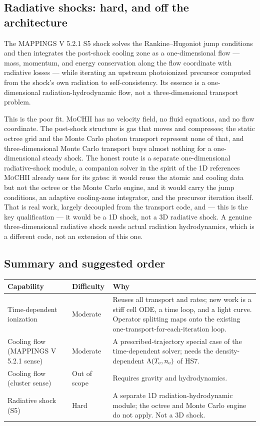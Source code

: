 \documentclass[english,a4paper]{my_memo}
\newcommand{\MoCHII}{\textsc{MoCHII}}
\newcommand{\Mappings}{MAPPINGS V 5.2.1}
\newcommand{\Te}{T_{\rm e}}
\newcommand{\nelec}{n_{\rm e}}
\begin{document}
\subsection{Radiative shocks: hard, and off the architecture}

The \Mappings{} S5 shock solves the Rankine--Hugoniot jump conditions and
then integrates the post-shock cooling zone as a one-dimensional flow ---
mass, momentum, and energy conservation along the flow coordinate with
radiative losses --- while iterating an upstream photoionized precursor
computed from the shock's own radiation to self-consistency.  Its essence
is a one-dimensional radiation-hydrodynamic flow, not a three-dimensional
transport problem.

This is the poor fit.  \MoCHII{} has no velocity field, no fluid
equations, and no flow coordinate.  The post-shock structure is gas that
moves and compresses; the static octree grid and the Monte Carlo photon
transport represent none of that, and three-dimensional Monte Carlo
transport buys almost nothing for a one-dimensional steady shock.  The
honest route is a separate one-dimensional radiative-shock module, a
companion solver in the spirit of the 1D references \MoCHII{} already uses
for its gates: it would reuse the atomic and cooling data but not the
octree or the Monte Carlo engine, and it would carry the jump conditions,
an adaptive cooling-zone integrator, and the precursor iteration itself.
That is real work, largely decoupled from the transport code, and --- this
is the key qualification --- it would be a 1D shock, not a 3D radiative
shock.  A genuine three-dimensional radiative shock needs actual radiation
hydrodynamics, which is a different code, not an extension of this one.

\subsection{Summary and suggested order}

\begin{center}
\begin{tabular}{P{0.26\textwidth}P{0.16\textwidth}P{0.44\textwidth}}
\toprule
Capability & Difficulty & Why \\
\midrule
Time-dependent ionization & Moderate &
  Reuses all transport and rates; new work is a stiff cell ODE, a time
  loop, and a light curve.  Operator splitting maps onto the existing
  one-transport-for-each-iteration loop. \\
Cooling flow (\Mappings{} sense) & Moderate &
  A prescribed-trajectory special case of the time-dependent solver;
  needs the density-dependent $\Lambda(\Te,\nelec)$ of HS7. \\
Cooling flow (cluster sense) & Out of scope &
  Requires gravity and hydrodynamics. \\
Radiative shock (S5) & Hard &
  A separate 1D radiation-hydrodynamic module; the octree and Monte Carlo
  engine do not apply.  Not a 3D shock. \\
\bottomrule
\end{tabular}
\end{center}
\end{document}
